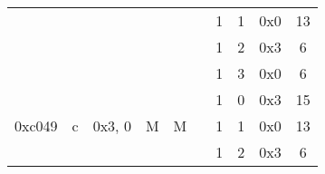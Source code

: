 \documentclass[11pt]{homework}
\newcommand{\cmark}{\ding{51}}%
\begin{document}
\begin{arabicparts}
{\begin{tabular}{|c|c|c|c|c|c|c|c|c|c|}
            \cline{7-10}
                                     &                                                                        &                             &                                                                   &                                                                    &                                                                      & 1                        & 1     & 0x0 & 13            \\
            \cline{7-10}
                                     &                                                                        &                             &                                                                   &                                                                    &                                                                      & 1                        & 2     & 0x3 & 6             \\
            \cline{7-10}
                                     &                                                                        &                             &                                                                   &                                                                    &                                                                      & 1                        & 3     & 0x0 & 6             \\
            \hline
            \multirow{4}{*}{0xc049}  & \multirow{4}{*}{c}                                                     & \multirow{4}{*}{0x3, 0}     & \multirow{4}{*}{M}                                                & \multirow{4}{*}{M}                                                 & \multirow{4}{*}{\cmark}                                              & 1                        & 0     & 0x3 & 15            \\
            \cline{7-10}
                                     &                                                                        &                             &                                                                   &                                                                    &                                                                      & 1                        & 1     & 0x0 & 13            \\
            \cline{7-10}
                                     &                                                                        &                             &                                                                   &                                                                    &                                                                      & 1                        & 2     & 0x3 & 6             \\

\end{tabular}}
\end{arabicparts}
\end{document}
